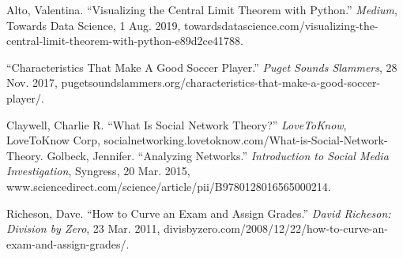 \documentclass[12pt]{article}
\begin{document}
\newpage
\begin{thebibliography}{}
 
      
     Alto, Valentina. “Visualizing the Central Limit Theorem with Python.”  \emph{Medium}, Towards Data Science, 1 Aug. 2019, towardsdatascience.com/visualizing-the-central-limit-theorem-with-python-e89d2ce41788.
      
      “Characteristics That Make A Good Soccer Player.” \emph{Puget Sounds Slammers}, 28 Nov. 2017, pugetsoundslammers.org/characteristics-that-make-a-good-soccer-player/. 
      
     Claywell, Charlie R. “What Is Social Network Theory?” \emph{LoveToKnow}, LoveToKnow Corp, socialnetworking.lovetoknow.com/What-is-Social-Network-Theory.
      Golbeck, Jennifer. “Analyzing Networks.” \emph{Introduction to Social Media Investigation}, Syngress, 20 Mar. 2015, www.sciencedirect.com/science/article/pii/B9780128016565000214.
      
      Richeson, Dave. “How to Curve an Exam and Assign Grades.”  \emph{David Richeson: Division by Zero}, 23 Mar. 2011, divisbyzero.com/2008/12/22/how-to-curve-an-exam-and-assign-grades/.
      
     

\end{thebibliography}
\newpage
\end{document}
